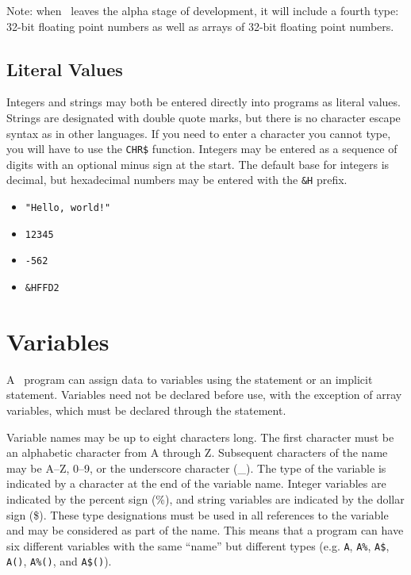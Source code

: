 \documentclass{report}
\begin{document}
    Note: when \BASIC\ leaves the alpha stage of development, it will include a fourth type: 32-bit floating point numbers as well
    as arrays of 32-bit floating point numbers.

    \subsection*{Literal Values}

    Integers and strings may both be entered directly into programs as literal values.
    Strings are designated with double quote marks, but there is no character escape
    syntax as in other languages. If you need to enter a character you cannot type,
    you will have to use the \verb+CHR$+ function. Integers may be entered as a sequence
    of digits with an optional minus sign at the start. The default base for integers
    is decimal, but hexadecimal numbers may be entered with the \verb+&H+ prefix.

    \begin{itemize}
        \item \verb+"Hello, world!"+
        \item \verb+12345+
        \item \verb+-562+
        \item \verb+&HFFD2+
    \end{itemize}

    \section*{Variables}

    A \BASIC\ program can assign data to variables using the  statement or an implicit  statement.
    Variables need not be declared before use, with the exception of array variables, which must be declared through the
     statement.

    Variable names may be up to eight characters long. The first character must be an alphabetic character from A through Z.
    Subsequent characters of the name may be A--Z, 0--9, or the underscore character (\_). The type of the variable is indicated
    by a character at the end of the variable name. Integer variables are indicated by the percent sign (\%), and string
    variables are indicated by the dollar sign (\$). These type designations must be used in all references to the variable and may
    be considered as part of the name. This means that a program can have six different variables with the same ``name'' but different
    types (e.g. \verb+A+, \verb+A%+, \verb+A$+, \verb+A()+, \verb+A%()+, and \verb+A$()+).
\end{document}

